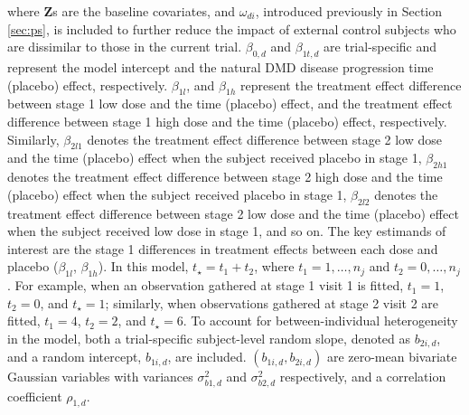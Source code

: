 where $\boldsymbol{Z}$s are the baseline covariates, and $\omega_{di}$, introduced previously in Section \ref{sec:ps}, is included to further reduce the impact of external control subjects who are dissimilar to those in the current trial. \(\beta_{0, d}\) and \(\beta_{1t,d}\) are trial-specific and represent the model intercept and the natural \ac{DMD} disease progression time (placebo) effect, respectively. \(\beta_{1l}\), and \(\beta_{1h}\) represent the treatment effect difference between stage 1 low dose and the time (placebo) effect, and the treatment effect difference between stage 1 high dose and the time (placebo) effect, respectively. Similarly, \(\beta_{2l1}\) denotes the treatment effect difference between stage 2 low dose and the time (placebo) effect when the subject received placebo in stage 1, \(\beta_{2h1}\) denotes the treatment effect difference between stage 2 high dose and the time (placebo) effect when the subject received placebo in stage 1, \(\beta_{2l2}\) denotes the treatment effect difference between stage 2 low dose and the time (placebo) effect when the subject received low dose in stage 1, and so on. The key estimands of interest are the stage 1 differences in treatment effects between each dose and placebo ($\beta_{1l}$, $\beta_{1h}$). In this model, \( t_{\star} = t_1 + t_2 \), where \( t_1 = 1, \ldots, n_j \) and \( t_2 = 0, \ldots, n_j \). For example, when an observation gathered at stage 1 visit 1 is fitted, \( t_1 = 1 \), \( t_2 = 0 \), and \( t_{\star} = 1 \); similarly, when observations gathered at stage 2 visit 2 are fitted, \( t_1 = 4 \), \( t_2 = 2 \), and \( t_{\star} = 6 \). To account for between-individual heterogeneity in the model, both a trial-specific subject-level random slope, denoted as $b_{2i, d}$, and a random intercept, $b_{1i, d}$, are included. $(b_{1i, d}, b_{2i, d})$ are zero-mean bivariate Gaussian variables with variances $\sigma_{b1, d}^2$ and $\sigma_{b2, d}^2$ respectively, and a correlation coefficient $\rho_{1,d}$.


